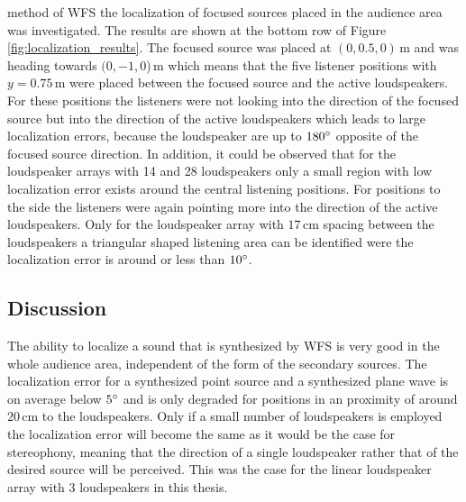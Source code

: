  method of \ac{WFS} the localization of focused
sources placed in the audience area was investigated. The results are shown
at the bottom row of Figure\,\ref{fig:localization_results}. The focused source
was placed at $(0,0.5,0)$\,m and was heading towards $(0,-1,0$)\,m which means that
the five listener positions with $y=0.75$\,m were placed between the focused
source and the active loudspeakers. For these positions the listeners were not
looking into the direction of the focused source but into the direction of the
active loudspeakers which leads to large localization errors, because the
loudspeaker are up to $180^\circ$ opposite of the focused source direction.
In addition, it could be observed that for the loudspeaker arrays with 14 and 28
loudspeakers only a small region with low localization error exists around the
central listening positions. For positions to the side the
listeners were again pointing more into the direction of the active loudspeakers.
Only for the loudspeaker array with $17$\,cm spacing
between the loudspeakers a triangular shaped listening area can be identified were the
localization error is around or less than $10^\circ$.


\subsection{Discussion}
\label{sec:localization_discussion}
%
The ability to localize a sound that is synthesized by \ac{WFS} is very good in
the whole audience area, independent of the form of the secondary sources. The
localization error for a synthesized point source and a synthesized plane wave
is on average below $5^\circ$ and is only degraded for positions in an
proximity of around $20$\,cm to the loudspeakers. Only if a small number of loudspeakers
is employed the localization error will become the same as it would be the case
for stereophony, meaning that the direction of a single loudspeaker rather that of
the desired source will be perceived. This was the case for the linear
loudspeaker array with 3 loudspeakers in this thesis.

